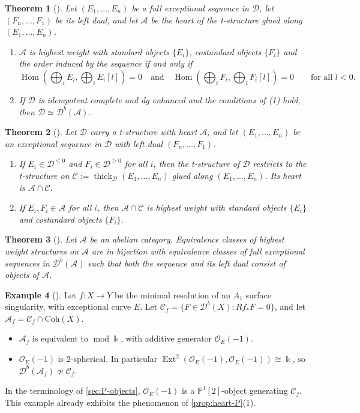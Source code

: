 \documentclass[11pt,reqno]{amsart}
\theoremstyle{plain}
\newtheorem{theorem}{Theorem}[section]
\theoremstyle{definition}
\newtheorem{example}[theorem]{Example}
\theoremstyle{remark}
\newcommand{\kk}{\Bbbk}
\DeclareMathOperator{\Hom}{Hom}
\DeclareMathOperator{\Ext}{Ext}
\newcommand{\modd}{\operatorname{mod}}
\newcommand{\Db}{\mathcal{D}^b}
\newcommand{\thick}[2][\cD]{\operatorname{thick}_{#1}(#2)}
\newcommand{\Pn}[2]{\mathbb{P}^{#1}[#2]}
\newcommand{\cD}{\mathcal{D}}
\newcommand{\cA}{\mathcal{A}}
\newcommand{\cC}{\mathcal{C}}
\newcommand{\cO}{\mathcal{O}}
\begin{document}
\begin{theorem}[{\cite[Thm.~3.1]{BB26}}]\label{thm:BB-3.1}
Let $(E_1,\dots,E_n)$ be a full exceptional sequence in $\cD$, let $(F_n,\dots,F_1)$ be its left dual, and let $\cA$ be the heart of the t-structure glued along $(E_1,\dots,E_n)$.
\begin{enumerate}
\item $\cA$ is highest weight with standard objects $\{E_i\}$, costandard objects $\{F_i\}$ and the order induced by the sequence if and only if
\[\Hom(\textstyle\bigoplus_iE_i,\bigoplus_iE_i[l])=0\quad\text{and}\quad\Hom(\bigoplus_iF_i,\bigoplus_iF_i[l])=0\qquad\text{for all }l<0.\]
\item If $\cD$ is idempotent complete and dg enhanced and the conditions of \textup{(1)} hold, then $\cD\simeq\Db(\cA)$.
\end{enumerate}
\end{theorem}

\begin{theorem}[{\cite[Thm.~3.4]{BB26}}]\label{thm:BB-3.4}
Let $\cD$ carry a t-structure with heart $\cA$, and let $(E_1,\dots,E_n)$ be an exceptional sequence in $\cD$ with left dual $(F_n,\dots,F_1)$.
\begin{enumerate}
\item If $E_i\in\cD^{\le0}$ and $F_i\in\cD^{\ge0}$ for all $i$, then the t-structure of $\cD$ restricts to the t-structure on $\cC:=\thick{E_1,\dots,E_n}$ glued along $(E_1,\dots,E_n)$. Its heart is $\cA\cap\cC$.
\item If $E_i,F_i\in\cA$ for all $i$, then $\cA\cap\cC$ is highest weight with standard objects $\{E_i\}$ and costandard objects $\{F_i\}$.
\end{enumerate}
\end{theorem}

\begin{theorem}[{\cite[Thm.~3.8]{BB26}}]\label{thm:BB-3.8}
Let $\cA$ be an abelian category. Equivalence classes of highest weight structures on $\cA$ are in bijection with equivalence classes of full exceptional sequences in $\Db(\cA)$ such that both the sequence and its left dual consist of objects of $\cA$.
\end{theorem}

\begin{example}[{\cite[Ex.~5.11]{BB26}}]\label{ex:BB-5.11}
Let $f\colon X\to Y$ be the minimal resolution of an $A_1$ surface singularity, with exceptional curve $E$. Let $\cC_f=\{F\in\Db(X):Rf_*F=0\}$, and let $\mathcal{A}_f=\cC_f\cap\mathrm{Coh}(X)$.
\begin{itemize}
\item $\mathcal{A}_f$ is equivalent to $\modd\kk$, with additive generator $\cO_E(-1)$.
\item $\cO_E(-1)$ is $2$-spherical. In particular $\Ext^2(\cO_E(-1),\cO_E(-1))\cong\kk$, so $\Db(\mathcal{A}_f)\not\simeq\cC_f$.
\end{itemize}
In the terminology of \cref{sec:P-objects}, $\cO_E(-1)$ is a $\Pn12$-object generating $\cC_f$. This example already exhibits the phenomenon of \cref{prop:heart-P}(1).
\end{example}
\end{document}
